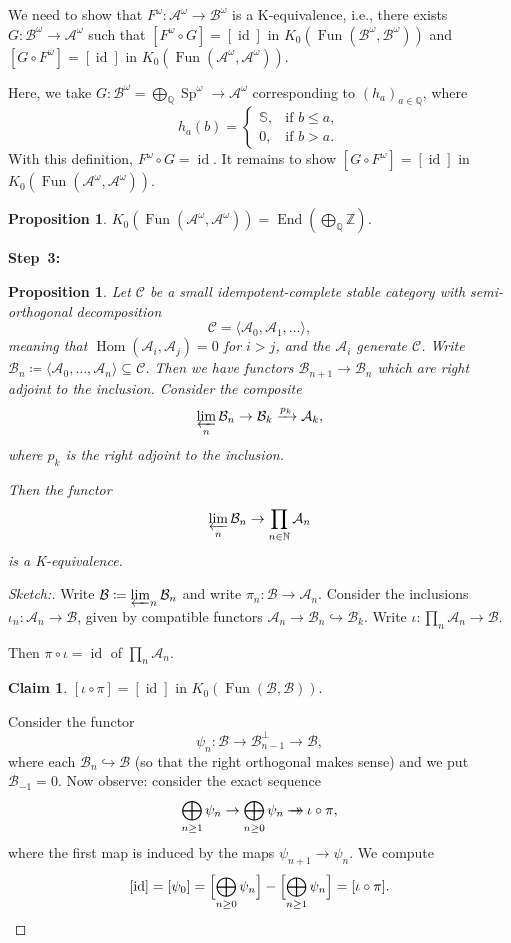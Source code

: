 \documentclass[draft]{amsart}
\newcommand{\NN}{\mathbb{N}}
\newcommand{\ZZ}{\mathbb{Z}}
\newcommand{\QQ}{\mathbb{Q}}
\renewcommand{\SS}{\mathbb{S}}
\newcommand{\cat}[1]{\mathcal{#1}}
\newcommand{\injto}{\mathbin{\hookrightarrow}}
\newcommand{\epito}{\mathbin{\to\kern-.8em\to}}
\DeclareMathOperator{\Hom}{Hom}
\DeclareMathOperator{\End}{End}
\DeclareMathOperator{\Sp}{Sp}
\DeclareMathOperator{\Fun}{Fun}
\DeclareMathOperator{\id}{id}
\newtheorem{prop}[thm]{Proposition}
\theoremstyle{definition}
\newtheorem*{claim}{Claim}
\begin{document}
We need to show that $F^{\omega} \colon \cat A^\omega \to \cat B^\omega$ is a K-equivalence, i.e., there exists $G\colon \cat B^\omega \to \cat A^\omega$ such that $[F^\omega\circ G] = [\id]$ in $K_0(\Fun(\cat B^\omega, \cat B^\omega))$ and $[G\circ F^\omega] = [\id]$ in $K_0(\Fun(\cat A^\omega, \cat A^\omega))$.

Here, we take $G\colon \cat B^\omega = \bigoplus_{\QQ}\Sp^{\omega} \to \cat A^\omega$ corresponding to $(h_a)_{a\in \QQ}$, where
\[
h_a(b)= \begin{cases}
\SS, & \text{if $b\le a$}, \\
0, & \text{if $b>a$}.
\end{cases}
\]
With this definition, $F^\omega\circ G = \id$. It remains to show $[G\circ F^\omega] = [\id]$ in $K_0(\Fun(\cat A^\omega, \cat A^\omega))$.

\begin{prop}
$K_0(\Fun(\cat A^\omega, \cat A^\omega)) = \End(\bigoplus_{\QQ}\ZZ)$.
\end{prop}

\textbf{Step~3:}
\begin{prop}
Let $\cat C$ be a small idempotent-complete stable category with semi-orthogonal decomposition
\[
\cat C = \langle \cat A_0, \cat A_1, \dotsc \rangle,
\]
meaning that $\Hom(\cat A_i, \cat A_j) = 0$ for $i>j$, and the $\cat A_i$ generate $\cat C$. Write $\cat B_n \coloneqq \langle \cat A_0,\dotsc,\cat A_n\rangle \subseteq \cat C$. Then we have functors $\cat B_{n+1} \to \cat B_n$ which are right adjoint to the inclusion. Consider the composite
\[
\varprojlim_n \cat B_n \to \cat B_k \xrightarrow{p_k} \cat A_k,
\]
where $p_k$ is the right adjoint to the inclusion. 

Then the functor
\[
\varprojlim_n \cat B_n \to \prod_{n\in \NN} \cat A_n
\]
is a K-equivalence.
\end{prop}
\begin{proof}[Sketch:]
Write $\cat B \coloneqq \varprojlim_n \cat B_n$ and write $\pi_n\colon \cat B\to \cat A_n$. Consider the inclusions $\iota_n\colon \cat A_n\to \cat B$, given by compatible functors $\cat A_n\to \cat B_n \injto \cat B_k$. Write $\iota\colon \prod_n \cat A_n \to \cat B$. 

Then $\pi\circ\iota = \id$ of $\prod_n\cat A_n$.

\begin{claim}
$[\iota\circ\pi] = [\id]$ in $K_0(\Fun(\cat B, \cat B))$.
\end{claim}
Consider the functor 
\[
\psi_n\colon \cat B\to \cat B_{n-1}^{\perp} \to \cat B,
\]
where each $\cat B_n \injto \cat B$ (so that the right orthogonal makes sense) and we put $\cat B_{-1} = 0$. Now observe: consider the exact sequence
\[
\bigoplus_{n\ge1} \psi_n \to \bigoplus_{n\ge0} \psi_n \epito \iota\circ\pi,
\]
where the first map is induced by the maps $\psi_{n+1} \to \psi_n$. We compute
\[
[\id]  = [\psi_0] = \Bigl[\bigoplus_{n\ge0} \psi_n\Bigr] - \Bigl[\bigoplus_{n\ge1}\psi_n\Bigr] = [\iota\circ\pi].
\]
\end{proof}
\end{document}
